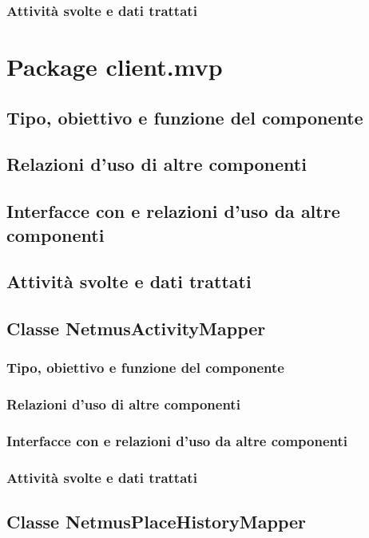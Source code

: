 \subsubsection*{Attivit\`a svolte e dati trattati}

\newpage
\section{Package client.mvp} %
\subsection*{Tipo, obiettivo e funzione del componente}
\subsection*{Relazioni d'uso di altre componenti}
\subsection*{Interfacce con e relazioni d'uso da altre componenti}
\subsection*{Attivit\`a svolte e dati trattati}

\subsection{Classe NetmusActivityMapper}
\subsubsection*{Tipo, obiettivo e funzione del componente}
\subsubsection*{Relazioni d'uso di altre componenti}
\subsubsection*{Interfacce con e relazioni d'uso da altre componenti}
\subsubsection*{Attivit\`a svolte e dati trattati}

\subsection{Classe NetmusPlaceHistoryMapper}

